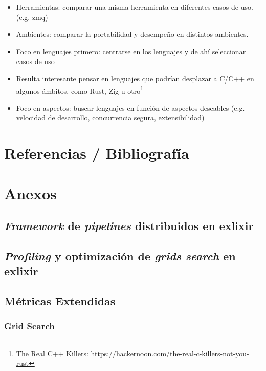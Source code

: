 \documentclass[11pt]{article}
\let\Oldsection\section
\renewcommand{\section}{\FloatBarrier\Oldsection}
\let\Oldsubsection\subsection
\renewcommand{\subsection}{\FloatBarrier\Oldsubsection}
\let\Oldsubsubsection\subsubsection
\renewcommand{\subsubsection}{\FloatBarrier\Oldsubsubsection}
\begin{document}
\begin{itemize}
    \item Herramientas: comparar una misma herramienta en diferentes casos de uso. (e.g. zmq)
    \item Ambientes: comparar la portabilidad y desempeño en distintos ambientes.
    \item Foco en lenguajes primero: centrarse en los lenguajes y de ahí seleccionar casos de uso
    \item Resulta interesante pensar en lenguajes que podrían desplazar a C/C++ en algunos ámbitos, como Rust, Zig u otro\footnote{The Real C++ Killers: \url{https://hackernoon.com/the-real-c-killers-not-you-rust}}
    \item Foco en aspectos: buscar lenguajes en función de aspectos deseables (e.g. velocidad de desarrollo, concurrencia segura, extensibilidad)
\end{itemize}

\section{Referencias / Bibliografía}

\printbibliography %

\section{Anexos} \label{annex} %

\subsection{\textit{Framework} de \textit{pipelines} distribuidos en exlixir} \label{sec:anex:elixir_pipelines}

\subsection{\textit{Profiling} y optimización de \textit{grids search} en exlixir} \label{sec:anex:elixir_gs_optimization}

\subsection{Métricas Extendidas}

\subsubsection{Grid Search}
\end{document}
